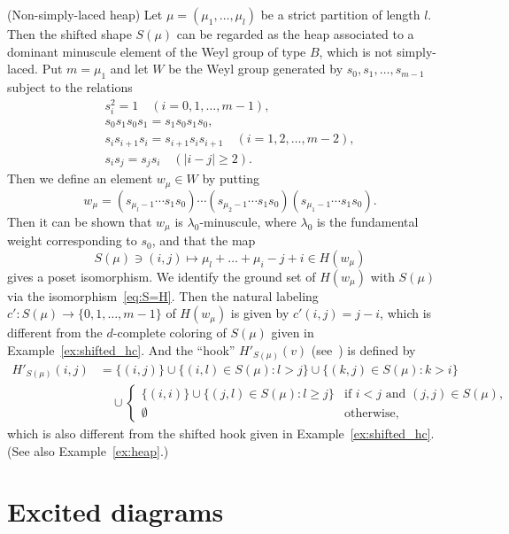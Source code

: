\begin{exam} (Non-simply-laced heap)
\label{ex:shifted-B}
Let $\mu = (\mu_1, \dots, \mu_l)$ be a strict partition of length $l$.
Then the shifted shape $S(\mu)$ can be regarded as 
the heap associated to a dominant minuscule element of the Weyl group of type $B$,
which is not simply-laced.
Put $m = \mu_1$ and let $W$ be the Weyl group generated by $s_0, s_1, \dots, s_{m-1}$ 
subject to the relations
\begin{gather*}
s_i^2 = 1 \quad(i=0, 1, \dots, m-1),
\\
s_0 s_1 s_0 s_1 = s_1 s_0 s_1 s_0,
\\
s_i s_{i+1} s_i = s_{i+1} s_i s_{i+1} \quad(i=1, 2, \dots, m-2),
\\
s_i s_j = s_j s_i \quad(|i-j| \ge 2).
\end{gather*}
Then we define an element $w_\mu \in W$ by putting
$$
w_\mu = (s_{\mu_l-1} \cdots s_1 s_0) \cdots (s_{\mu_2-1} \cdots s_1 s_0) (s_{\mu_1-1} \cdots s_1 s_0).
$$
Then it can be shown that $w_\mu$ is $\lambda_0$-minuscule, where $\lambda_0$ is the fundamental weight 
corresponding to $s_0$, and that the map
\begin{equation}
\label{eq:S=H}
S(\mu) \ni (i,j) \mapsto \mu_l + \dots + \mu_i - j + i \in H(w_\mu)
\end{equation}
gives a poset isomorphism.
We identify the ground set of $H(w_\mu)$ with $S(\mu)$ via the isomorphism~\eqref{eq:S=H}.
Then the natural labeling $c' : S(\mu) \to \{ 0, 1, \dots, m-1 \}$ of $H(w_\mu)$ is given by 
$c'(i,j) = j-i$, which is different from the $d$-complete coloring of $S(\mu)$ given 
in Example~\ref{ex:shifted_hc}.
And the ``hook'' $H'_{S(\mu)}(v)$ (see~\cite[Definition~4.8]{N2}) is defined by
\begin{align*}
H'_{S(\mu)}(i,j)
 &=
\{ (i,j) \}
 \cup
\{ (i,l) \in S(\mu) : l > j \}
 \cup
\{ (k,j) \in S(\mu) : k > i \}
\\
 &\quad
\cup
\begin{cases}
 \{ (i,i) \} \cup \{ (j,l) \in S(\mu) : l \ge j \} &\text{if $i<j$ and $(j,j) \in S(\mu)$,} \\
 \emptyset &\text{otherwise,}
\end{cases}
\end{align*}
which is also different from the shifted hook given in Example~\ref{ex:shifted_hc}.
(See also Example~\ref{ex:heap}.)
\end{exam}

\section{%
Excited diagrams
}\label{sect3}

